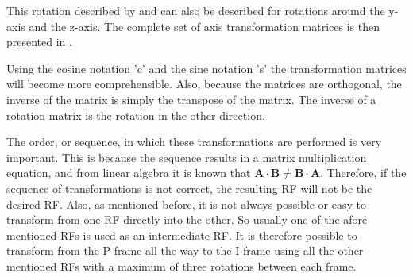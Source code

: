 \noindent
This rotation described by  and  can also be described for rotations around the y-axis and the z-axis. The complete set of axis transformation matrices is then presented in .

Using the cosine notation 'c' and the sine notation 's' the transformation matrices will become more comprehensible. Also, because the matrices are orthogonal, the inverse of the matrix is simply the transpose of the matrix. The inverse of a rotation matrix is the rotation in the other direction.

The order, or sequence, in which these transformations are performed is very important. This is because the sequence results in a matrix multiplication equation, and from linear algebra it is known that $\mathbf{A}\cdot\mathbf{B}\neq\mathbf{B}\cdot\mathbf{A}$. Therefore, if the sequence of transformations is not correct, the resulting \ac{RF} will not be the desired \ac{RF}.  Also, as mentioned before, it is not always possible or easy to transform from one \ac{RF} directly into the other. So usually one of the afore mentioned \ac{RF}s is used as an intermediate \ac{RF}. It is therefore possible to transform from the P-frame all the way to the I-frame using all the other mentioned \ac{RF}s with a maximum of three rotations between each frame. 

